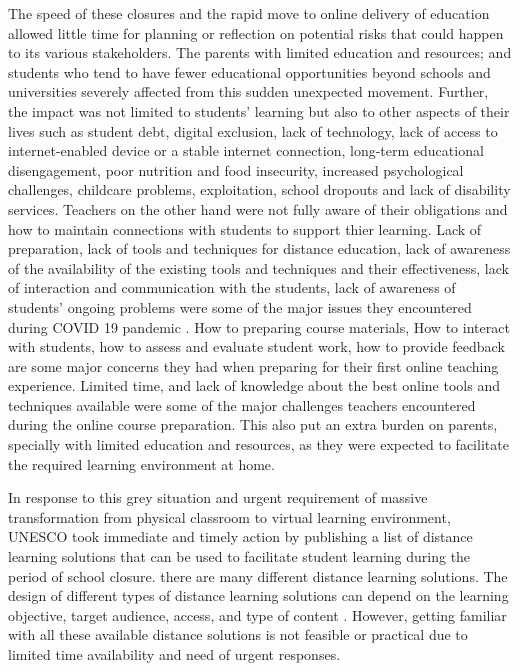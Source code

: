 \documentclass[11pt,a4paper,]{article}
\begin{document}
The speed of these closures and the rapid move to online delivery of education allowed little time for planning or reflection on potential risks that could happen to its various stakeholders. The parents with limited education and resources; and students who tend to have fewer educational opportunities beyond schools and universities severely affected from this sudden unexpected movement. Further, the impact was not limited to students' learning but also to other aspects of their lives such as student debt, digital exclusion, lack of technology, lack of access to internet-enabled device or a stable internet connection, long-term educational disengagement, poor nutrition and food insecurity, increased psychological challenges, childcare problems, exploitation, school dropouts and lack of disability services. Teachers on the other hand were not fully aware of their obligations and how to maintain connections with students to support thier learning. Lack of preparation, lack of tools and techniques for distance education, lack of awareness of the availability of the existing tools and techniques and their effectiveness, lack of interaction and communication with the students, lack of awareness of students' ongoing problems were some of the major issues they encountered during COVID 19 pandemic \autocite{drane2020impact,daniel2020education,unescoadverse2020}. How to preparing course materials, How to interact with students, how to assess and evaluate student work, how to provide feedback are some major concerns they had when preparing for their first online teaching experience. Limited time, and lack of knowledge about the best online tools and techniques available were some of the major challenges teachers encountered during the online course preparation. This also put an extra burden on parents, specially with limited education and resources, as they were expected to facilitate the required learning environment at home.

In response to this grey situation and urgent requirement of massive transformation from physical classroom to virtual learning environment, UNESCO took immediate and timely action by publishing a list of distance learning solutions that can be used to facilitate student learning during the period of school closure. there are many different distance learning solutions. The design of different types of distance learning solutions can depend on the learning objective, target audience, access, and type of content \autocite{moore2011learning}. However, getting familiar with all these available distance solutions is not feasible or practical due to limited time availability and need of urgent responses.
\end{document}
